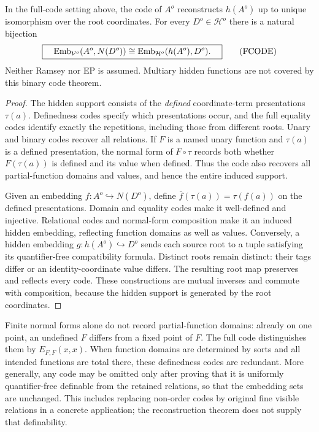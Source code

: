 \begin{lemma}
\label{lem:foundational-full-code-embeddings}
In the full-code setting above, the code of $A^o$ reconstructs $h(A^o)$
up to unique isomorphism over the root coordinates. For every
$D^o\in\mathcal H^o$ there is a natural bijection
\[
 \boxed{\quad
 \operatorname{Emb}_{\mathcal V^o}(A^o,N(D^o))
  \cong
 \operatorname{Emb}_{\mathcal H^o}(h(A^o),D^o).
 \quad}\tag{FCODE}\label{eq:foundational-full-code-embeddings}
\]
Neither Ramsey nor EP is assumed. Multiary hidden functions are not
covered by this binary code theorem.
\end{lemma}
\begin{proof}
The hidden support consists of the \emph{defined} coordinate-term
presentations $\tau(a)$. Definedness codes specify which presentations
occur, and the full equality codes identify exactly the repetitions,
including those from different roots. Unary and binary codes recover
all relations. If $F$ is a named unary function and $\tau(a)$ is a defined
presentation, the normal form of $F\circ\tau$ records both whether
$F(\tau(a))$ is defined and its value when defined. Thus the code also
recovers all partial-function domains and values, and hence the entire
induced support.

Given an embedding $f:A^o\hookrightarrow N(D^o)$, define
$\bar f(\tau(a))=\tau(f(a))$ on the defined presentations. Domain and
equality codes make it well-defined and injective. Relational codes and
normal-form composition make it an induced hidden embedding, reflecting
function domains as well as values. Conversely, a hidden embedding
$g:h(A^o)\hookrightarrow D^o$ sends each source root to a tuple satisfying
its quantifier-free compatibility formula. Distinct roots remain distinct:
their tags differ or an identity-coordinate value differs. The resulting
root map preserves and reflects every code. These constructions are
mutual inverses and commute with composition, because the hidden support
is generated by the root coordinates.
\end{proof}

\begin{remark}
Finite normal forms alone do not record partial-function domains: already
on one point, an undefined $F$ differs from a fixed point of $F$.
The full code distinguishes them by $E_{F,F}(x,x)$. When function domains
are determined by sorts and all intended functions are total there, these
definedness codes are redundant. More generally, any code may be omitted
only after proving that it is uniformly quantifier-free definable from
the retained relations, so that the embedding sets are unchanged. This includes
replacing non-order codes by original fine visible relations in a concrete
application; the reconstruction theorem does not supply that definability.
\end{remark}

